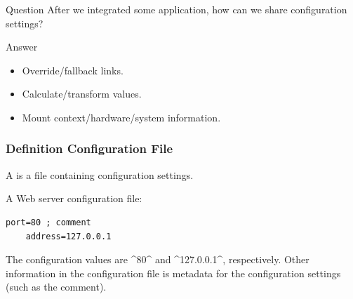 \begin{frame}
	\begin{alertblock}{Question}
	After we integrated some application, how can we share configuration settings?
	\end{alertblock}

	\pause
	\begin{exampleblock}{Answer}
	\begin{itemize}
	\item Override/fallback links.
	\item Calculate/transform values.
	\item Mount context/hardware/system information.
	\end{itemize}
	\end{exampleblock}
\end{frame}

\begin{frame}[fragile]
	\frametitle{Definition Configuration File}

	\pause

	A  is a file containing configuration settings.

	A Web server configuration file:

	\begin{lstlisting}[gobble=4]
	port=80 ; comment
	address=127.0.0.1\end{lstlisting}

	\pause

	The configuration values are ^80^ and ^127.0.0.1^, respectively.
	Other information in the configuration file is metadata for the configuration settings (such as the comment).
\end{frame}

